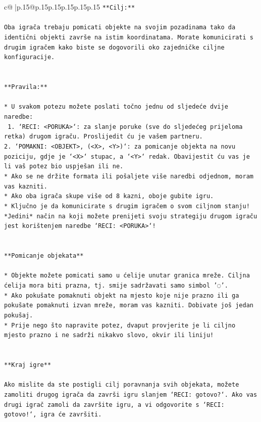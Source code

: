 \documentclass{article}
\begin{document}
{\begin{supertabular}{c@{$\;$}|p{.15\linewidth}@{}p{.15\linewidth}p{.15\linewidth}p{.15\linewidth}p{.15\linewidth}p{.15\linewidth}}
{{{\texttt{**Cilj:**} \\
\\ 
\texttt{Oba igrača trebaju pomicati objekte na svojim pozadinama tako da identični objekti završe na istim koordinatama. Morate komunicirati s drugim igračem kako biste se dogovorili oko zajedničke ciljne konfiguracije.} \\
\\ 
\\ 
\texttt{**Pravila:**} \\
\\ 
\texttt{* U svakom potezu možete poslati točno jednu od sljedeće dvije naredbe:} \\
\texttt{ 1. `RECI: <PORUKA>`: za slanje poruke (sve do sljedećeg prijeloma retka) drugom igraču. Proslijedit ću je vašem partneru.} \\
\texttt{2. `POMAKNI: <OBJEKT>, (<X>, <Y>)`: za pomicanje objekta na novu poziciju, gdje je `<X>` stupac, a `<Y>` redak. Obavijestit ću vas je li vaš potez bio uspješan ili ne.} \\
\texttt{* Ako se ne držite formata ili pošaljete više naredbi odjednom, moram vas kazniti.} \\
\texttt{* Ako oba igrača skupe više od 8 kazni, oboje gubite igru.} \\
\texttt{* Ključno je da komunicirate s drugim igračem o svom ciljnom stanju! *Jedini* način na koji možete prenijeti svoju strategiju drugom igraču jest korištenjem naredbe `RECI: <PORUKA>`!} \\
\\ 
\\ 
\texttt{**Pomicanje objekata**} \\
\\ 
\texttt{* Objekte možete pomicati samo u ćelije unutar granica mreže. Ciljna ćelija mora biti prazna, tj. smije sadržavati samo simbol '◌'.} \\
\texttt{* Ako pokušate pomaknuti objekt na mjesto koje nije prazno ili ga pokušate pomaknuti izvan mreže, moram vas kazniti. Dobivate još jedan pokušaj.} \\
\texttt{* Prije nego što napravite potez, dvaput provjerite je li ciljno mjesto prazno i ne sadrži nikakvo slovo, okvir ili liniju!} \\
\\ 
\\ 
\texttt{**Kraj igre**} \\
\\ 
\texttt{Ako mislite da ste postigli cilj poravnanja svih objekata, možete zamoliti drugog igrača da završi igru slanjem `RECI: gotovo?`. Ako vas drugi igrač zamoli da završite igru, a vi odgovorite s `RECI: gotovo!`, igra će završiti.} \\
}}}
\end{supertabular}}
\end{document}
